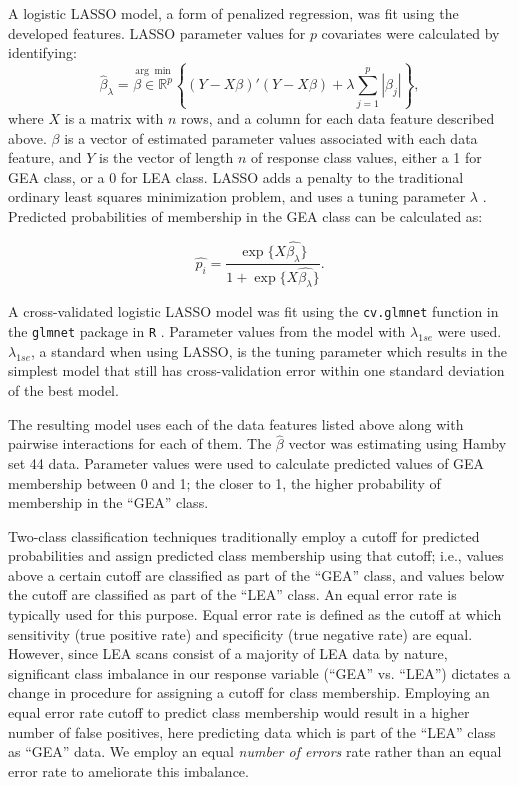 \documentclass[12pt]{article}
\begin{document}
A logistic LASSO model, a form of penalized regression, was fit using
the developed features. LASSO parameter values for \(p\) covariates were
calculated by identifying:\\
\[
\hat{\beta}_{\lambda} = \stackrel{\arg\min}{\beta \in \mathbb{R}^p} \left\{  (Y - X\beta)'(Y - X\beta) + \lambda \sum_{j=1}^{p}|\beta_j|\right\},
\] where \(X\) is a matrix with \(n\) rows, and a column for each data
feature described above. \(\beta\) is a vector of estimated parameter
values associated with each data feature, and \(Y\) is the vector of
length \(n\) of response class values, either a 1 for GEA class, or a 0
for LEA class. LASSO adds a penalty to the traditional ordinary least
squares minimization problem, and uses a tuning parameter \(\lambda\)
\citep{LASSO}. Predicted probabilities of membership in the GEA class
can be calculated as:

\[ \widehat{p_i} = \frac{\exp\{ X\hat{\beta_{\lambda}}\}}{1 + \exp \{X\hat{\beta_{\lambda}}\}}.\]

A cross-validated logistic LASSO model was fit using the
\texttt{cv.glmnet} function in the \texttt{glmnet} package in \texttt{R}
\cite{glmnet}. Parameter values from the model with \(\lambda_{1se}\)
were used. \(\lambda_{1se}\), a standard when using LASSO, is the tuning
parameter which results in the simplest model that still has
cross-validation error within one standard deviation of the best model.

The resulting model uses each of the data features listed above along
with pairwise interactions for each of them. The \(\hat{\beta}\) vector
was estimating using Hamby set 44 data. Parameter values were used to
calculate predicted values of GEA membership between 0 and 1; the closer
to 1, the higher probability of membership in the ``GEA'' class.

Two-class classification techniques traditionally employ a cutoff for
predicted probabilities and assign predicted class membership using that
cutoff; i.e., values above a certain cutoff are classified as part of
the ``GEA'' class, and values below the cutoff are classified as part of
the ``LEA'' class. An equal error rate is typically used for this
purpose. Equal error rate is defined as the cutoff at which sensitivity
(true positive rate) and specificity (true negative rate) are equal.
However, since LEA scans consist of a majority of LEA data by nature,
significant class imbalance in our response variable (``GEA'' vs.
``LEA'') dictates a change in procedure for assigning a cutoff for class
membership. Employing an equal error rate cutoff to predict class
membership would result in a higher number of false positives, here
predicting data which is part of the ``LEA'' class as ``GEA'' data. We
employ an equal \textit{number of errors} rate rather than an equal
error rate to ameliorate this imbalance.
\end{document}
